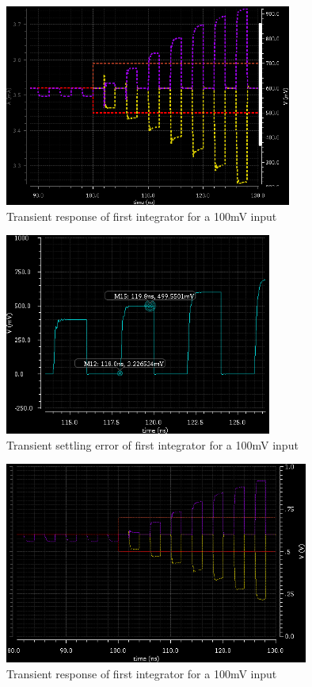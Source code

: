 \documentclass[conference]{IEEEtran}
\begin{document}
\begin{figure}[H]
\centering
\includegraphics[height=250px]{piktures/st1_trans}
\caption{Transient response of first integrator for a 100mV input}
\label{fig:st1_trans}
\end{figure}

\begin{figure}[H]
\centering
\includegraphics[height=250px]{piktures/st2_error}
\caption{Transient settling error of first integrator for a 100mV input}
\label{fig:st2_error}
\end{figure}

\begin{figure}[H]
\centering
\includegraphics[height=250px]{piktures/st2_trans}
\caption{Transient response of first integrator for a 100mV input}
\label{fig:st2_trans}
\end{figure}
\end{document}
